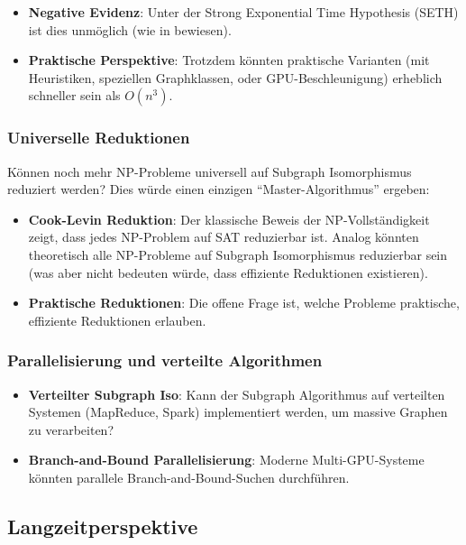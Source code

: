 ﻿\documentclass[a4paper,12pt]{article}
\theoremstyle{definition}
\begin{document}
\begin{itemize}
	\item \textbf{Negative Evidenz}: Unter der Strong Exponential Time Hypothesis (SETH) ist dies unmöglich (wie in \cite{subgraph2026} bewiesen).
	
	\item \textbf{Praktische Perspektive}: Trotzdem könnten praktische Varianten (mit Heuristiken, speziellen Graphklassen, oder GPU-Beschleunigung) erheblich schneller sein als $O(n^3)$.
\end{itemize}

\subsubsection{Universelle Reduktionen}

Können noch mehr NP-Probleme universell auf Subgraph Isomorphismus reduziert werden? Dies würde einen einzigen ``Master-Algorithmus'' ergeben:

\begin{itemize}
	\item \textbf{Cook-Levin Reduktion}: Der klassische Beweis der NP-Vollständigkeit zeigt, dass jedes NP-Problem auf SAT reduzierbar ist. Analog könnten theoretisch alle NP-Probleme auf Subgraph Isomorphismus reduzierbar sein (was aber nicht bedeuten würde, dass effiziente Reduktionen existieren).
	
	\item \textbf{Praktische Reduktionen}: Die offene Frage ist, welche Probleme praktische, effiziente Reduktionen erlauben.
\end{itemize}

\subsubsection{Parallelisierung und verteilte Algorithmen}

\begin{itemize}
	\item \textbf{Verteilter Subgraph Iso}: Kann der Subgraph Algorithmus auf verteilten Systemen (MapReduce, Spark) implementiert werden, um massive Graphen zu verarbeiten?
	
	\item \textbf{Branch-and-Bound Parallelisierung}: Moderne Multi-GPU-Systeme könnten parallele Branch-and-Bound-Suchen durchführen.
\end{itemize}

\subsection{Langzeitperspektive}
\end{document}
